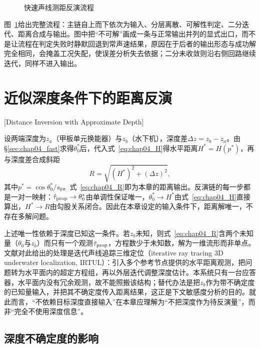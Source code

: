 \begin{figure}[htbp]
 \centering
 \begin{tikzpicture}[x=1cm,y=1cm]
  
 \end{tikzpicture}
 \caption[快速声线测距反演流程]{快速声线测距反演流程}
 \label{fig:chap04_flow}
\end{figure}

图~\ref{fig:chap04_flow}给出完整流程：主链自上而下依次为输入、分层离散、可解性判定、二分迭代、距离合成与输出。图中把“不可解”画成一条与正常输出并列的显式出口，而不是让流程在判定失败时静默回退到常声速结果，原因在于后者的输出形态与成功解完全相同，会掩盖工况失配，使误差分析失去依据；二分未收敛则沿右侧回路继续迭代，同样不进入输出。

\section{近似深度条件下的距离反演}[Distance Inversion with Approximate Depth]
\label{sec:chap04_inversion}

设两端深度为$z_a$（甲板单元换能器）与$z_b$（水下机），深度差$\Delta z=z_b-z_a$。由\S\ref{sec:chap04_fast}求得$\theta_0^{*}$后，代入式~\eqref{eq:chap04_H}得水平距离$H^{*}=H(p^{*})$，再与深度差合成斜距
\begin{equation}
 R=\sqrt{\left(H^{*}\right)^{2}+\left(\Delta z\right)^{2}},
\label{eq:chap04_R}
\end{equation}
其中$p^{*}=\cos\theta_0^{*}/s_0$。式~\eqref{eq:chap04_R}即为本章的距离输出。反演链的每一步都是一对一映射：$\hat{\tau}_{\rm prop}\to\theta_0^{*}$由单调性保证唯一，$\theta_0^{*}\to H^{*}$由式~\eqref{eq:chap04_H}直接算出，$H^{*}\to R$由勾股关系闭合。因此在本章设定的输入条件下，距离解唯一，不存在多解问题。

上述唯一性依赖于深度已知这一条件。若$z_b$未知，则式~\eqref{eq:chap04_R}含两个未知量（$\theta_0$与$z_b$）而只有一个观测$\hat{\tau}_{\rm prop}$，方程数少于未知数，解为一维流形而非单点。文献对此给出的处理是迭代声线追踪三维定位（iterative ray tracing 3D underwater localization, IRTUL）：引入多个参考节点提供的水平距离观测，把问题转为水平面内的超定方程组，再以外层迭代调整深度估计\cite{huangFastRaytracingbasedPrecise2024}。本系统只有一台应答器，水平面内没有冗余观测，故不能照搬该结构；替代办法是把$z_b$作为带不确定度的已知量输入，并把其不确定度传入距离结果，这正是下文敏感度分析的目的。就此而言，“不依赖目标深度直接输入”在本章应理解为“不把深度作为待反演量”，而非“完全不使用深度信息”。

\subsection{深度不确定度的影响}

